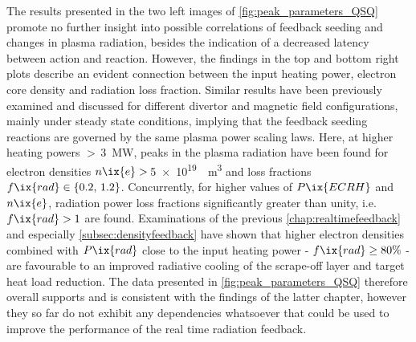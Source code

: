         The results presented in the two left images of \cref{fig:peak_parameters_QSQ} promote no further insight into possible correlations of feedback seeding and changes in plasma radiation, besides the indication of a decreased latency between action and reaction. However, the findings in the top and bottom right plots describe an evident connection between the input heating power, electron core density and radiation loss fraction. Similar results have been previously examined and discussed for different divertor and magnetic field configurations, mainly under steady state conditions\cite{Klinger2016,Fuchert2018,Zhang2020}, implying that the feedback seeding reactions are governed by the same plasma power scaling laws. Here, at higher heating powers $>\,$\SI{3}{\mega\watt}, peaks in the plasma radiation have been found for electron densities $n\ix{e}>\,$\SI{5e19}{\per\cubic\meter} and loss fractions $f\ix{rad}\in\left\{0.2,\,1.2\right\}$. Concurrently, for higher values of $P\ix{ECRH}$ and $n\ix{e}$, radiation power loss fractions significantly greater than unity, i.e. $f\ix{rad}>1$ are found. Examinations of the previous \cref{chap:realtimefeedback} and especially \cref{subsec:densityfeedback} have shown that higher electron densities combined with $P\ix{rad}$ close to the input heating power - $f\ix{rad}\ge80\%$ - are favourable to an improved radiative cooling of the scrape-off layer and target heat load reduction. The data presented in \cref{fig:peak_parameters_QSQ} therefore overall supports and is consistent with the findings of the latter chapter, however they so far do not exhibit any dependencies whatsoever that could be used to improve the performance of the real time radiation feedback.%
%
